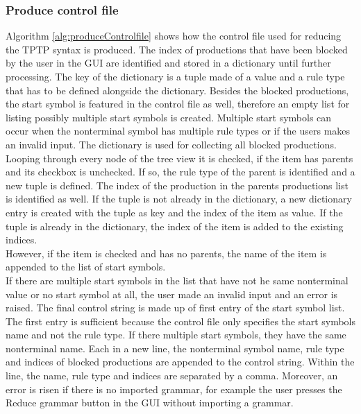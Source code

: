 \subsubsection{Produce control file}\label{sec:ImplementationGUIProduceControlFile}

Algorithm \ref{alg:produceControlfile} shows how the control file used for reducing the \ac{TPTP} syntax is produced. The index of productions that have been blocked by the user in the GUI are identified and stored in a dictionary until further processing. The key of the dictionary is a tuple made of a value and a rule type that has to be defined alongside the dictionary. Besides the blocked productions, the start symbol is featured in the control file as well, therefore an empty list for listing possibly multiple start symbols is created. Multiple start symbols can occur when the nonterminal symbol has multiple rule types or if the users makes an invalid input. The dictionary is used for collecting all blocked productions. Looping through every node of the tree view it is checked, if the item has parents and its checkbox is unchecked. If so, the rule type of the parent is identified and a new tuple is defined. The index of the production in the parents productions list is identified as well. If the tuple is not already in the dictionary, a new dictionary entry is created with the tuple as key and the index of the item as value. If the tuple is already in the dictionary, the index of the item is added to the existing indices. \\
However, if the item is checked and has no parents, the name of the item is appended to the list of start symbols. \\
If there are multiple start symbols in the list that have not he same nonterminal value or no start symbol at all, the user made an invalid input and an error is raised. 
The final control string is made up of first entry of the start symbol list. The first entry is sufficient because the control file only specifies the start symbols name and not the rule type. If there multiple start symbols, they have the same nonterminal name. 
Each in a new line, the nonterminal symbol name, rule type and indices of blocked productions are appended to the control string. Within the line, the name, rule type and indices are separated by a comma.
Moreover, an error is risen if there is no imported grammar, for example the user presses the Reduce grammar button in the GUI without importing a grammar.

